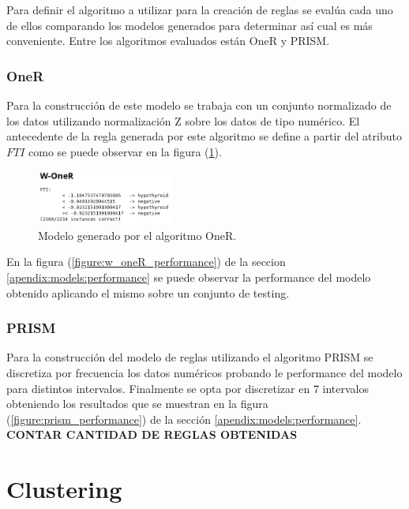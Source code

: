 \documentclass[osajnl,twocolumn,showpacs,superscriptaddress,10pt,floatfix]{revtex4-1} %
\begin{document}
Para definir el algoritmo a utilizar para la creación de reglas se evalúa cada uno de ellos comparando los modelos generados para determinar así cual es más conveniente. Entre los algoritmos evaluados están OneR y PRISM. \\

\subsubsection{OneR}

Para la construcción de este modelo se trabaja con un conjunto normalizado de los datos utilizando normalización Z sobre los datos de tipo numérico. El antecedente de la regla generada por este algoritmo se define a partir del atributo $FTI$ como se puede observar en la figura (\ref{figure:w_oneR}). \\

\begin{figure}[H]
    \centering
    \includegraphics[width=0.4\textwidth]{models/w_oneR}
    \caption{Modelo generado por el algoritmo OneR.}
    \label{figure:w_oneR}
\end{figure}

En la figura (\ref{figure:w_oneR_performance}) de la seccion \ref{apendix:models:performance} se puede observar la performance del modelo obtenido aplicando el mismo sobre un conjunto de testing. \\

\subsubsection{PRISM}

Para la construcción del modelo de reglas utilizando el algoritmo PRISM se discretiza por frecuencia los datos numéricos probando le performance del modelo para distintos intervalos. Finalmente se opta por discretizar en 7 intervalos obteniendo los resultados que se muestran en la figura (\ref{figure:prism_performance}) de la sección \ref{apendix:models:performance}. \\

\textbf{CONTAR CANTIDAD DE REGLAS OBTENIDAS}

\section{Clustering}
\end{document}
